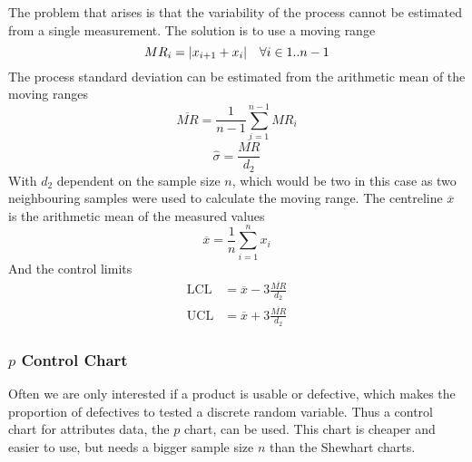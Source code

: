 \documentclass[11pt]{article}
\theoremstyle{definition}
\newcommand*\samplemean[1]{\overline{#1}}
\DeclarePairedDelimiter\abs{\lvert}{\rvert}
\begin{document}
The problem that arises is that the variability of the process cannot be estimated from a single measurement. The solution is to use a moving range
\begin{equation*}
	MR_i = \abs{x_{i+1} + x_i}\quad \forall i\in1..n-1
\end{equation*}
The process standard deviation can be estimated from the arithmetic mean of the moving ranges
\begin{equation*}
	\samplemean{MR} = \frac{1}{n-1}\sum_{i=1}^{n-1}MR_i
\end{equation*}
\begin{equation*}
	\hat{\sigma} = \frac{\samplemean{MR}}{d_2}
\end{equation*}
With $d_2$ dependent on the sample size $n$, which would be two in this case as two neighbouring samples were used to calculate the moving range.
The centreline $\samplemean{x}$ is the arithmetic mean of the measured values
\begin{equation*}
	\samplemean{x} = \frac{1}{n}\sum_{i=1}^{n}x_i
\end{equation*}
And the control limits
\begin{align*}
	\text{LCL} &= \samplemean{x} - 3\frac{\samplemean{MR}}{d_2}\\
	\text{UCL} &= \samplemean{x} + 3\frac{\samplemean{MR}}{d_2}
\end{align*}

\subsubsection{$p$ Control Chart}
Often we are only interested if a product is usable or defective, which makes the proportion of defectives to tested a discrete random variable. Thus a control chart for attributes data, the $p$ chart, can be used. This chart is cheaper and easier to use, but needs a bigger sample size $n$ than the Shewhart charts.
\end{document}
